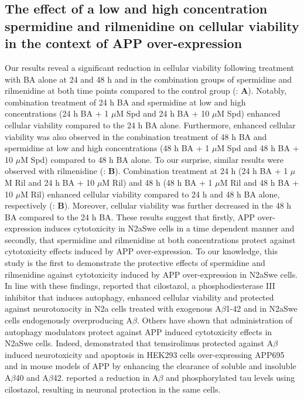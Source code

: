\subsection{The effect of a low and high concentration spermidine and rilmenidine on cellular viability in the context of APP over-expression}
Our results reveal a significant reduction in cellular viability following treatment with BA alone at 24 and 48 h and in the combination groups of spermidine and rilmenidine at both time points compared to the control group (: \textbf{A}). Notably, combination treatment of 24 h BA and spermidine at low and high concentrations (24 h BA + 1 $\mu$M Spd and 24 h BA + 10 $\mu$M Spd) enhanced cellular viability compared to the 24 h BA alone. Furthermore, enhanced cellular viability was also observed in the combination treatment of 48 h BA and spermidine at low and high concentrations (48 h BA + 1 $\mu$M Spd and 48 h BA + 10 $\mu$M Spd) compared to 48 h BA alone. To our surprise, similar results were observed with rilmenidine (: \textbf{B}). Combination treatment at 24 h (24 h BA + 1 $\mu$M Ril and 24 h BA + 10 $\mu$M Ril) and 48 h (48 h BA + 1 $\mu$M Ril and 48 h BA + 10 $\mu$M Ril) enhanced cellular viability compared to 24 h and 48 h BA alone, respectively (: \textbf{B}). Moreover, cellular viability was further decreased in the 48 h BA compared to the 24 h BA. These results suggest that firstly, APP over-expression induces cytotoxicity in N2aSwe cells in a time dependent manner and secondly, that spermidine and rilmenidine at both concentrations protect against cytotoxicity effects induced by APP over-expression. To our knowledge, this study is the first to demonstrate the protective effects of spermidine and rilmenidine against cytotoxicity induced by APP over-expression in N2aSwe cells. In line with these findings, \citet{Lee2015} reported that cilostazol, a phosphodiesterase III inhibitor that induces autophagy, enhanced cellular viability and protected against neurotoxocity in N2a cells treated with exogenous A$\beta$1-42 and in N2aSwe cells endogenously overproducing A$\beta$. Others have shown that administration of autophagy modulators protect against APP induced cytotoxicity effects in N2aSwe cells. Indeed, \citet{Jiang2014a} demonstrated that temsirolimus protected against A$\beta$ induced neurotoxicity and apoptosis in HEK293 cells over-expressing APP695 and in mouse models of APP by enhancing the clearance of soluble and insoluble A$\beta$40 and A$\beta$42. \citet{Park2011} reported a reduction in A$\beta$ and phosphorylated tau levels using cilostazol, resulting in neuronal protection in the same cells.

